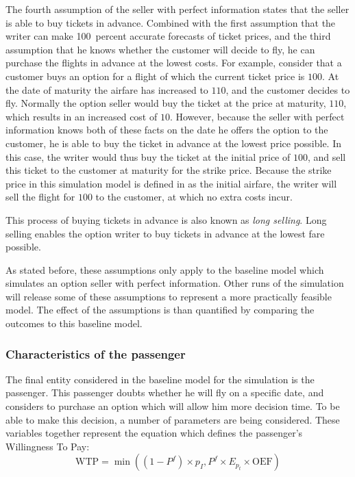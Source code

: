 The fourth assumption of the seller with perfect information states that the seller is able to buy tickets in advance. Combined with the first assumption that the writer can make 100~percent accurate forecasts of ticket prices, and the third assumption that he knows whether the customer will decide to fly, he can purchase the flights in advance at the lowest costs. For example, consider that a customer buys an option for a flight of which the current ticket price is $100$. At the date of maturity the airfare has increased to $110$, and the customer decides to fly. Normally the option seller would buy the ticket at the price at maturity, $110$, which results in an increased cost of $10$. However, because the seller with perfect information knows both of these facts on the date he offers the option to the customer, he is able to buy the ticket in advance at the lowest price possible. In this case, the writer would thus buy the ticket at the initial price of $100$, and sell this ticket to the customer at maturity for the strike price. Because the strike price in this simulation model is defined in as the initial airfare, the writer will sell the flight for $100$ to the customer, at which no extra costs incur.

This process of buying tickets in advance is also known as \emph{long selling}. Long selling enables the option writer to buy tickets in advance at the lowest fare possible.

As stated before, these assumptions only apply to the baseline model which simulates an option seller with perfect information. Other runs of the simulation will release some of these assumptions to represent a more practically feasible model. The effect of the assumptions is than quantified by comparing the outcomes to this baseline model.


\subsubsection{Characteristics of the passenger}
The final entity considered in the baseline model for the simulation is the passenger. This passenger doubts whether he will fly on a specific date, and considers to purchase an option which will allow him more decision time. To be able to make this decision, a number of parameters are being considered. These variables together represent the equation which defines the passenger's Willingness To Pay:
$$\mbox{WTP} = \min((1 - P^f) \times p_I, P^f \times E_{p_t} \times \mbox{OEF})$$

